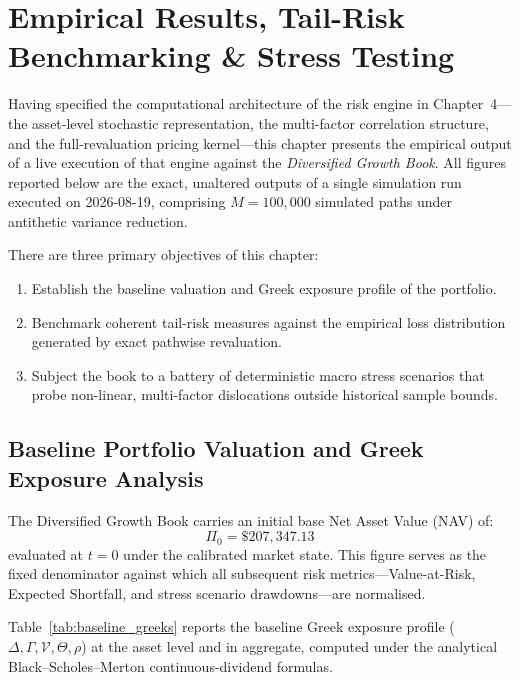 \documentclass{article}
\theoremstyle{plain}
\theoremstyle{definition}
\theoremstyle{remark}
\begin{document}
\section{Empirical Results, Tail-Risk Benchmarking \& Stress Testing}

Having specified the computational architecture of the risk engine in Chapter~4---the asset-level stochastic representation, the multi-factor correlation structure, and the full-revaluation pricing kernel---this chapter presents the empirical output of a live execution of that engine against the \textit{Diversified Growth Book}. All figures reported below are the exact, unaltered outputs of a single simulation run executed on 2026-08-19, comprising $M = 100,000$ simulated paths under antithetic variance reduction.

There are three primary objectives of this chapter:
\begin{enumerate}
    \item Establish the baseline valuation and Greek exposure profile of the portfolio.
    \item Benchmark coherent tail-risk measures against the empirical loss distribution generated by exact pathwise revaluation.
    \item Subject the book to a battery of deterministic macro stress scenarios that probe non-linear, multi-factor dislocations outside historical sample bounds.
\end{enumerate}

\subsection{Baseline Portfolio Valuation and Greek Exposure Analysis}
\label{sec:ch4_baseline}
The Diversified Growth Book carries an initial base Net Asset Value (NAV) of:
\begin{equation}
    \Pi_0 = \$207,347.13
\end{equation}
evaluated at $t = 0$ under the calibrated market state. This figure serves as the fixed denominator against which all subsequent risk metrics---Value-at-Risk, Expected Shortfall, and stress scenario drawdowns---are normalised.

Table~\ref{tab:baseline_greeks} reports the baseline Greek exposure profile ($\Delta, \Gamma, \mathcal{V}, \Theta, \rho$) at the asset level and in aggregate, computed under the analytical Black--Scholes--Merton continuous-dividend formulas.
\end{document}
